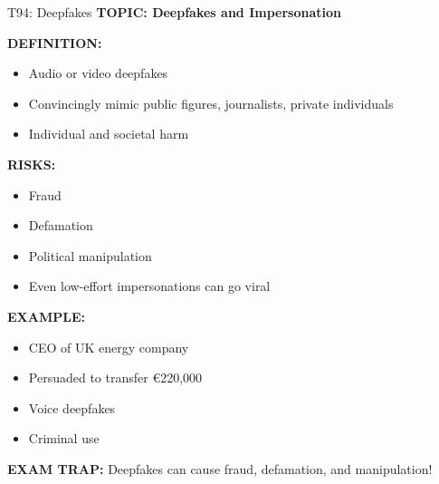 \documentclass[8pt]{beamer}
\begin{document}
	\begin{frame}{T94: Deepfakes}
		\fontsize{6.5}{7.5}\selectfont
		\textbf{TOPIC: Deepfakes and Impersonation}
		
		\vspace{0.1cm}
		\textbf{DEFINITION:}
		\begin{itemize}
			\item Audio or video deepfakes
			\item Convincingly mimic public figures, journalists, private individuals
			\item Individual and societal harm
		\end{itemize}
		
		\vspace{0.1cm}
		\textbf{RISKS:}
		\begin{itemize}
			\item Fraud
			\item Defamation
			\item Political manipulation
			\item Even low-effort impersonations can go viral
		\end{itemize}
		
		\vspace{0.1cm}
		\textbf{EXAMPLE:}
		\begin{itemize}
			\item CEO of UK energy company
			\item Persuaded to transfer €220,000
			\item Voice deepfakes
			\item Criminal use
		\end{itemize}
		
		\textcolor{myred}{\textbf{EXAM TRAP:}} Deepfakes can \textcolor{myblue}{cause fraud, defamation, and manipulation}!
	\end{frame}
	
\end{document}
